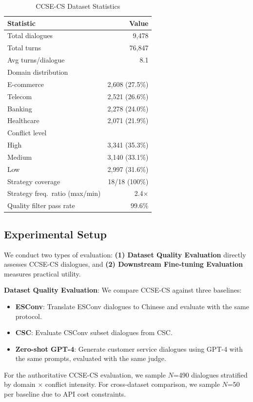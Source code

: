 \documentclass[11pt]{article}
\begin{document}
\begin{table}[t]
\centering
\caption{CCSE-CS Dataset Statistics}
\label{tab:dataset_stats}
\begin{tabular}{lr}
\toprule
\textbf{Statistic} & \textbf{Value} \\
\midrule
Total dialogues & 9,478 \\
Total turns & 76,847 \\
Avg turns/dialogue & 8.1 \\
\midrule
Domain distribution & \\
\hspace{2mm} E-commerce & 2,608 (27.5\%) \\
\hspace{2mm} Telecom & 2,521 (26.6\%) \\
\hspace{2mm} Banking & 2,278 (24.0\%) \\
\hspace{2mm} Healthcare & 2,071 (21.9\%) \\
\midrule
Conflict level & \\
\hspace{2mm} High & 3,341 (35.3\%) \\
\hspace{2mm} Medium & 3,140 (33.1\%) \\
\hspace{2mm} Low & 2,997 (31.6\%) \\
\midrule
Strategy coverage & 18/18 (100\%) \\
Strategy freq.\ ratio (max/min) & 2.4$\times$ \\
Quality filter pass rate & 99.6\% \\
\bottomrule
\end{tabular}
\end{table}

\subsection{Experimental Setup}

We conduct two types of evaluation: \textbf{(1) Dataset Quality Evaluation} directly assesses CCSE-CS dialogues, and \textbf{(2) Downstream Fine-tuning Evaluation} measures practical utility.

\textbf{Dataset Quality Evaluation}: We compare CCSE-CS against three baselines:
\begin{itemize}
  \item \textbf{ESConv}: Translate ESConv dialogues to Chinese and evaluate with the same protocol.
  \item \textbf{CSC}: Evaluate CSConv subset dialogues from CSC.
  \item \textbf{Zero-shot GPT-4}: Generate customer service dialogues using GPT-4 with the same prompts, evaluated with the same judge.
\end{itemize}
For the authoritative CCSE-CS evaluation, we sample $N$=490 dialogues stratified by domain $\times$ conflict intensity. For cross-dataset comparison, we sample $N$=50 per baseline due to API cost constraints.
\end{document}
